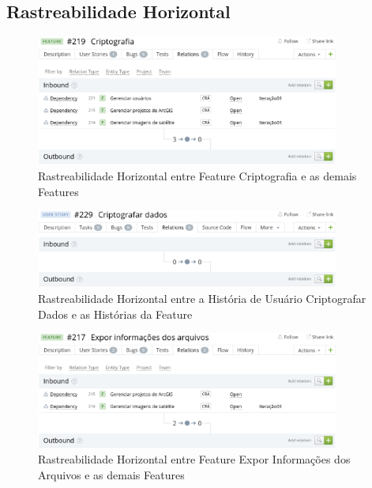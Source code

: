 \subsection{Rastreabilidade Horizontal}


  \begin{figure}[!htb]
    \centering
    \includegraphics[width=10cm, keepaspectratio=false]{figuras/rastreabilidade/horizontal/criptografia/feature_criptografia.eps}
    \caption{Rastreabilidade Horizontal entre Feature Criptografia e as demais Features}
  \end{figure}

    \begin{figure}[!htb]
    \centering
    \includegraphics[width=10cm, keepaspectratio=false]{figuras/rastreabilidade/horizontal/criptografia/Criptografar_dados.eps}
    \caption{Rastreabilidade Horizontal entre a História de Usuário Criptografar Dados e as Histórias da Feature}
  \end{figure}


  \begin{figure}[!htb]
    \centering
    \includegraphics[width=10cm, keepaspectratio=false]{figuras/rastreabilidade/horizontal/expor_info/feature_expor_info.eps}
    \caption{Rastreabilidade Horizontal entre Feature Expor Informações dos Arquivos e as demais Features}
  \end{figure}

